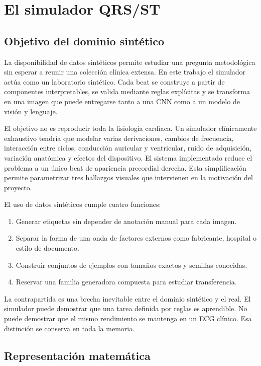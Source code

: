 \chapter{El simulador QRS/ST}
\label{chap:simulador}

\section{Objetivo del dominio sintético}

La disponibilidad de datos sintéticos permite estudiar una pregunta metodológica sin esperar a reunir una colección clínica extensa. En este trabajo el simulador actúa como un laboratorio sintético. Cada beat se construye a partir de componentes interpretables, se valida mediante reglas explícitas y se transforma en una imagen que puede entregarse tanto a una CNN como a un modelo de visión y lenguaje.

El objetivo no es reproducir toda la fisiología cardíaca. Un simulador clínicamente exhaustivo tendría que modelar varias derivaciones, cambios de frecuencia, interacción entre ciclos, conducción auricular y ventricular, ruido de adquisición, variación anatómica y efectos del dispositivo. El sistema implementado reduce el problema a un único beat de apariencia precordial derecha. Esta simplificación permite parametrizar tres hallazgos visuales que intervienen en la motivación del proyecto.

El uso de datos sintéticos cumple cuatro funciones:

\begin{enumerate}
\item Generar etiquetas sin depender de anotación manual para cada imagen.
\item Separar la forma de una onda de factores externos como fabricante, hospital o estilo de documento.
\item Construir conjuntos de ejemplos con tamaños exactos y semillas conocidas.
\item Reservar una familia generadora compuesta para estudiar transferencia.
\end{enumerate}

La contrapartida es una brecha inevitable entre el dominio sintético y el real. El simulador puede demostrar que una tarea definida por reglas es aprendible. No puede demostrar que el mismo rendimiento se mantenga en un ECG clínico. Esa distinción se conserva en toda la memoria.

\section{Representación matemática}

